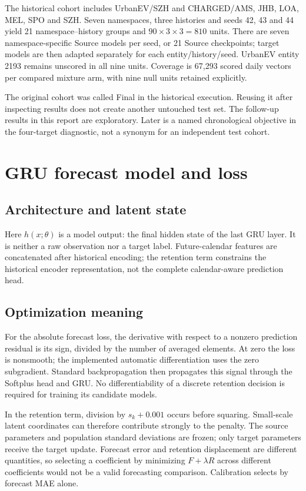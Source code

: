 \documentclass[pdflatex,iicol,sn-mathphys-num]{sn-jnl}
\begin{document}
The historical cohort includes UrbanEV/SZH and CHARGED/AMS, JHB, LOA, MEL, SPO and SZH. Seven namespaces, three histories and seeds 42, 43 and 44 yield 21 namespace--history groups and $90\times3\times3=810$ units. There are seven namespace-specific Source models per seed, or 21 Source checkpoints; target models are then adapted separately for each entity/history/seed. UrbanEV entity 2193 remains unscored in all nine units. Coverage is 67,293 scored daily vectors per compared mixture arm, with nine null units retained explicitly.

The original cohort was called Final in the historical execution. Reusing it after inspecting results does not create another untouched test set. The follow-up results in this report are exploratory. Later is a named chronological objective in the four-target diagnostic, not a synonym for an independent test cohort.

\section{GRU forecast model and loss}
\subsection{Architecture and latent state}


Here $h(x;\theta)$ is a model output: the final hidden state of the last GRU layer. It is neither a raw observation nor a target label. Future-calendar features are concatenated after historical encoding; the retention term constrains the historical encoder representation, not the complete calendar-aware prediction head.

\subsection{Optimization meaning}
For the absolute forecast loss, the derivative with respect to a nonzero prediction residual is its sign, divided by the number of averaged elements. At zero the loss is nonsmooth; the implemented automatic differentiation uses the zero subgradient. Standard backpropagation then propagates this signal through the Softplus head and GRU. No differentiability of a discrete retention decision is required for training its candidate models.

In the retention term, division by $s_k+0.001$ occurs before squaring. Small-scale latent coordinates can therefore contribute strongly to the penalty. The source parameters and population standard deviations are frozen; only target parameters receive the target update. Forecast error and retention displacement are different quantities, so selecting a coefficient by minimizing $F+\lambda R$ across different coefficients would not be a valid forecasting comparison. Calibration selects by forecast MAE alone.
\end{document}
